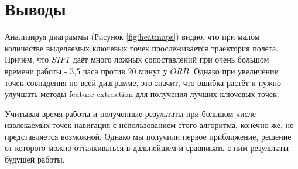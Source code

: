 \section{Выводы}

Анализируя диаграммы (Рисунок \ref{fig:heatmaps}) видно, что при малом количестве выделяемых ключевых точек прослеживается траектория полёта. Причём, что $SIFT$ даёт много ложных сопоставлений при очень большом времени работы - 3,5 часа против 20 минут у $ORB$. Однако при увеличении точек совпадения  по всей диаграмме, это значит, что ошибка растёт и нужно улучшать методы feature extraction для получения лучших ключевых точек.

Учитывая время работы и полученные результаты при большом числе извлекаемых точек навигация с использованием этого алгоритма, конечно же, не представляется возможной. Однако мы получили первое приближение, решение  от которого можно отталкиваться в дальнейшем и сравнивать с ним результаты будущей работы.

\newpage